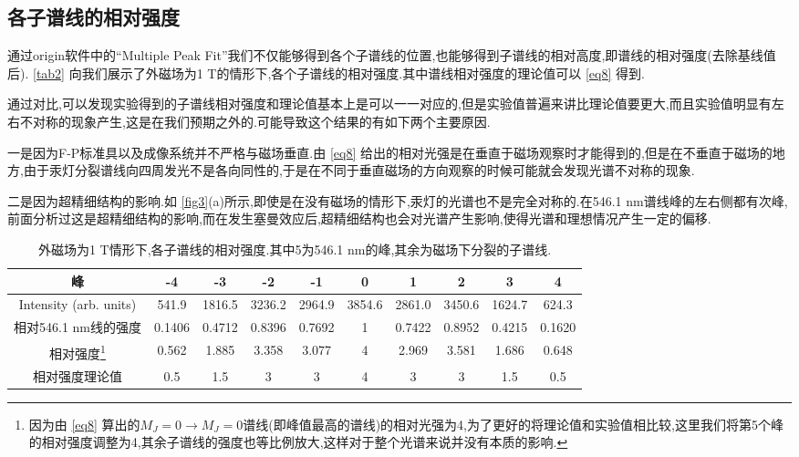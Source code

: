\documentclass[font=default]{mpltx}
\begin{document}
\subsection{各子谱线的相对强度}
通过origin软件中的``Multiple Peak Fit''我们不仅能够得到各个子谱线的位置,也能够得到子谱线的相对高度,即谱线的相对强度(去除基线值后). \autoref{tab2} 向我们展示了外磁场为1 T的情形下,各个子谱线的相对强度.其中谱线相对强度的理论值可以 \autoref{eq8} 得到.

通过对比,可以发现实验得到的子谱线相对强度和理论值基本上是可以一一对应的,但是实验值普遍来讲比理论值要更大,而且实验值明显有左右不对称的现象产生,这是在我们预期之外的.可能导致这个结果的有如下两个主要原因.

一是因为F-P标准具以及成像系统并不严格与磁场垂直.由 \autoref{eq8} 给出的相对光强是在垂直于磁场观察时才能得到的,但是在不垂直于磁场的地方,由于汞灯分裂谱线向四周发光不是各向同性的,于是在不同于垂直磁场的方向观察的时候可能就会发现光谱不对称的现象.

二是因为超精细结构的影响.如 \autoref{fig3}(a)所示,即使是在没有磁场的情形下,汞灯的光谱也不是完全对称的.在546.1 nm谱线峰的左右侧都有次峰,前面分析过这是超精细结构的影响,而在发生塞曼效应后,超精细结构也会对光谱产生影响,使得光谱和理想情况产生一定的偏移.

\begin{table}[]
  \caption{外磁场为1 T情形下,各子谱线的相对强度.其中5为546.1 nm的峰,其余为磁场下分裂的子谱线.}
  \label{tab2}
  \begin{ruledtabular}
  \begin{tabular}{cccccccccc}
  峰 & -4 & -3 & -2  & -1 & 0 & 1  & 2  & 3  &4 \\\hline
  Intensity (arb. units) & 541.9  & 1816.5 & 3236.2 & 2964.9 & 3854.6 & 2861.0 & 3450.6 & 1624.7 & 624.3  \\\hline
  相对546.1 nm线的强度         & 0.1406 & 0.4712 & 0.8396 & 0.7692 & 1      & 0.7422 & 0.8952 & 0.4215 & 0.1620 \\\hline
  相对强度\footnote{因为由 \autoref{eq8} 算出的$M_J=0\to M_J=0$谱线(即峰值最高的谱线)的相对光强为4,为了更好的将理论值和实验值相比较,这里我们将第5个峰的相对强度调整为4,其余子谱线的强度也等比例放大,这样对于整个光谱来说并没有本质的影响.}& 0.562  & 1.885  & 3.358  & 3.077  & 4      & 2.969  & 3.581  & 1.686  & 0.648  \\\hline
  相对强度理论值 & 0.5& 1.5&3 & 3&4  &3 &3  &1.5  &0.5       
  \end{tabular}
  \end{ruledtabular}
\end{table}
\end{document}
